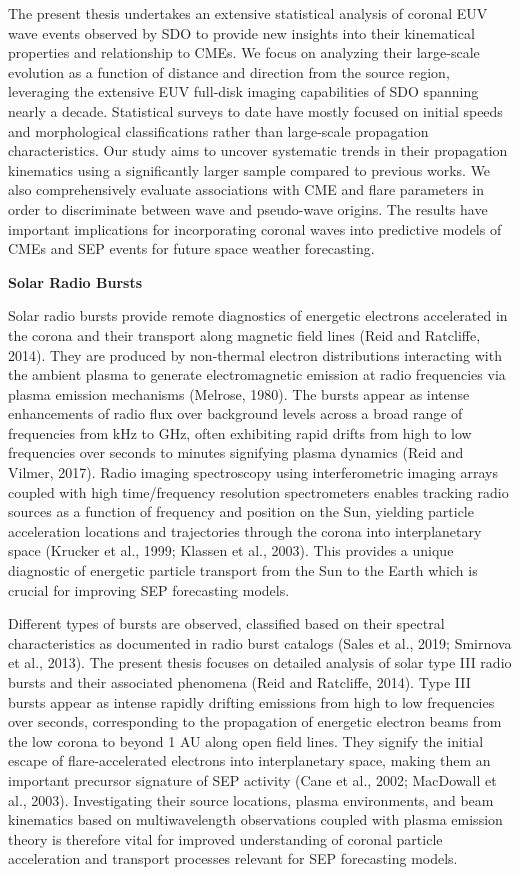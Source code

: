 The present thesis undertakes an extensive statistical analysis of coronal EUV wave events observed by SDO to provide new insights into their kinematical properties and relationship to CMEs. We focus on analyzing their large-scale evolution as a function of distance and direction from the source region, leveraging the extensive EUV full-disk imaging capabilities of SDO spanning nearly a decade. Statistical surveys to date have mostly focused on initial speeds and morphological classifications rather than large-scale propagation characteristics. Our study aims to uncover systematic trends in their propagation kinematics using a significantly larger sample compared to previous works. We also comprehensively evaluate associations with CME and flare parameters in order to discriminate between wave and pseudo-wave origins. The results have important implications for incorporating coronal waves into predictive models of CMEs and SEP events for future space weather forecasting.

\textbf{Solar Radio Bursts}

Solar radio bursts provide remote diagnostics of energetic electrons accelerated in the corona and their transport along magnetic field lines (Reid and Ratcliffe, 2014). They are produced by non-thermal electron distributions interacting with the ambient plasma to generate electromagnetic emission at radio frequencies via plasma emission mechanisms (Melrose, 1980). The bursts appear as intense enhancements of radio flux over background levels across a broad range of frequencies from kHz to GHz, often exhibiting rapid drifts from high to low frequencies over seconds to minutes signifying plasma dynamics (Reid and Vilmer, 2017). Radio imaging spectroscopy using interferometric imaging arrays coupled with high time/frequency resolution spectrometers enables tracking radio sources as a function of frequency and position on the Sun, yielding particle acceleration locations and trajectories through the corona into interplanetary space (Krucker et al., 1999; Klassen et al., 2003). This provides a unique diagnostic of energetic particle transport from the Sun to the Earth which is crucial for improving SEP forecasting models.

Different types of bursts are observed, classified based on their spectral characteristics as documented in radio burst catalogs (Sales et al., 2019; Smirnova et al., 2013). The present thesis focuses on detailed analysis of solar type III radio bursts and their associated phenomena (Reid and Ratcliffe, 2014). Type III bursts appear as intense rapidly drifting emissions from high to low frequencies over seconds, corresponding to the propagation of energetic electron beams from the low corona to beyond 1 AU along open field lines. They signify the initial escape of flare-accelerated electrons into interplanetary space, making them an important precursor signature of SEP activity (Cane et al., 2002; MacDowall et al., 2003). Investigating their source locations, plasma environments, and beam kinematics based on multiwavelength observations coupled with plasma emission theory is therefore vital for improved understanding of coronal particle acceleration and transport processes relevant for SEP forecasting models.

